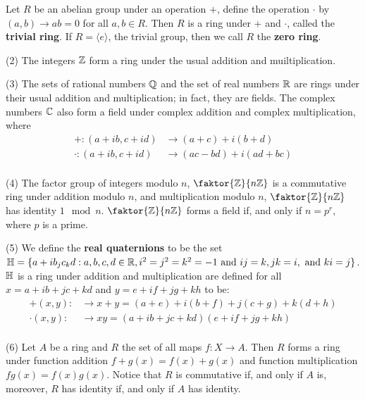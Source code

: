 \begin{example}\label{1.1}
    Let $R$ be an abelian group under an operation $+$, define the operation
    $\cdot$ by  $(a,b) \xrightarrow{} ab=0$ for all $a,b \in R$. Then $R$ is a
    ring under $+$ and  $\cdot$, called the  \textbf{trivial ring}. If
    $R=\langle e \rangle$, the trivial group, then we call $R$ the  \textbf{zero
    ring}.

    \item[(2)] The integers $\mathbb{Z}$ form a ring under the usual addition and
        muiltiplication.

    \item[(3)] The sets of rational numbers $\mathbb{Q}$ and the set of real numbers
        $\mathbb{R}$ are rings under their usual addition and multiplication; in fact,
        they are fields. The complex numbers $\mathbb{C}$ also form a field under
        complex addition and complex multiplication, where
        \begin{align*}
            +:(a+ib,c+id)   &   \xrightarrow{} (a+c)+i(b+d)   \\
            \cdot:(a+ib,c+id)   &   \xrightarrow{} (ac-bd)+i(ad+bc)   \\
        \end{align*}

    \item[(4)] The factor group of integers modulo $n$, $\faktor{\Z}{n\Z}$ is a
        commutative ring under addition modulo $n$, and multiplication modulo
        $n$, $\faktor{\Z}{n\Z}$ has identity $1 \mod{n}$. $\faktor{\Z}{n\Z}$
        forms a field if, and only if $n=p^r$, where $p$ is a prime.

    \item[(5)] We define the \textbf{real quaternions} to be the set
    $\mathbb{H}=\{a+ib_jc_kd : a,b,c,d \in \mathbb{R}, i^2=j^2=k^2=-1 \text{ and } ij=k,
    jk=i, \text{ and } ki=j\}$. $\mathbb{H}$ is a ring under addition and
    multiplication are defined for all $x=a+ib+jc+kd$ and $y=e+if+jg+kh$ to be:
    \begin{align*}
        +(x,y): &   \xrightarrow{} x+y=(a+e)+i(b+f)+j(c+g)+k(d+h)   \\
        \cdot(x,y):  &   \xrightarrow{} xy= (a+ib+jc+kd)(e+if+jg+kh) \\
    \end{align*}

    \item[(6)] Let $A$ be a ring and $R$ the set of all maps $f:X \xrightarrow{}
        A$. Then $R$ forms a ring under function addition  $f+g(x)=f(x)+g(x)$ and
        function multiplication $fg(x)=f(x)g(x)$. Notice that $R$ is commutative if,
        and only if  $A$ is, moreover,  $R$ has identity if, and only if  $A$ has
        identity.


\end{example}
